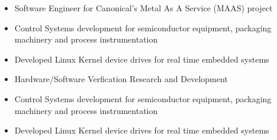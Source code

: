 \documentclass[10pt,a4paper,ragged2e,withhyper]{altacv}
\begin{document}
\begin{paracol}{2}


\begin{itemize}
\item Software Engineer for Canonical's Metal As A Service (MAAS) project
\end{itemize}

\divider

\begin{itemize}
\item Control Systems development for semiconductor equipment, packaging machinery and process instrumentation
\item Developed Linux Kernel device drives for real time embedded systems
\end{itemize}

\divider

\begin{itemize}
  \item Hardware/Software Verfication Research and Development
\end{itemize}

\divider

\begin{itemize}
  \item Control Systems development for semiconductor equipment, packaging machinery and process instrumentation
  \item Developed Linux Kernel device drives for real time embedded systems
\end{itemize}

\divider





\end{paracol}
\end{document}

